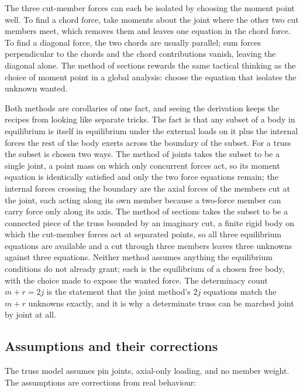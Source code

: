 The three cut-member forces can each be isolated by choosing the
moment point well. To find a chord force, take moments about the joint
where the other two cut members meet, which removes them and leaves one
equation in the chord force. To find a diagonal force, the two chords
are usually parallel; sum forces perpendicular to the chords and the
chord contributions vanish, leaving the diagonal alone. The method of
sections rewards the same tactical thinking as the choice of moment
point in a global analysis: choose the equation that isolates the
unknown wanted.

Both methods are corollaries of one fact, and seeing the derivation keeps
the recipes from looking like separate tricks. The fact is that any
subset of a body in equilibrium is itself in equilibrium under the
external loads on it plus the internal forces the rest of the body exerts
across the boundary of the subset. For a truss the subset is chosen two
ways. The method of joints takes the subset to be a single joint, a point
mass on which only concurrent forces act, so its moment equation is
identically satisfied and only the two force equations remain; the
internal forces crossing the boundary are the axial forces of the members
cut at the joint, each acting along its own member because a two-force
member can carry force only along its axis. The method of sections takes
the subset to be a connected piece of the truss bounded by an imaginary
cut, a finite rigid body on which the cut-member forces act at separated
points, so all three equilibrium equations are available and a cut
through three members leaves three unknowns against three equations.
Neither method assumes anything the equilibrium conditions do not already
grant; each is the equilibrium of a chosen free body, with the choice
made to expose the wanted force. The determinacy count $m + r = 2j$ is
the statement that the joint method's $2j$ equations match the $m + r$
unknowns exactly, and it is why a determinate truss can be marched joint
by joint at all.

\subsection{Assumptions and their corrections}

The truss model assumes pin joints, axial-only loading, and
no member weight. The assumptions are corrections from real
behaviour:

